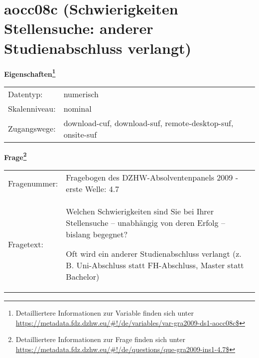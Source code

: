 
    \setcounter{footnote}{0}

    \vspace*{-1.8cm}
	\section{aocc08c (Schwierigkeiten Stellensuche: anderer Studienabschluss verlangt)}
	\label{section:aocc08c}



    \vspace*{0.5cm}
    \noindent\textbf{Eigenschaften\footnote{Detailliertere Informationen zur Variable finden sich unter
		\url{https://metadata.fdz.dzhw.eu/\#!/de/variables/var-gra2009-ds1-aocc08c$}}}\\
	\begin{tabularx}{\hsize}{@{}lX}
	Datentyp: & numerisch \\
	Skalenniveau: & nominal \\
	Zugangswege: &
	  download-cuf, 
	  download-suf, 
	  remote-desktop-suf, 
	  onsite-suf
 \\
    \end{tabularx}



				\vspace*{0.5cm}
                \noindent\textbf{Frage\footnote{Detailliertere Informationen zur Frage finden sich unter
		              \url{https://metadata.fdz.dzhw.eu/\#!/de/questions/que-gra2009-ins1-4.7$}}}\\
				\begin{tabularx}{\hsize}{@{}lX}
					Fragenummer: &
					  Fragebogen des DZHW-Absolventenpanels 2009 - erste Welle:
					  4.7
 \\
					Fragetext: & Welchen Schwierigkeiten sind Sie bei Ihrer Stellensuche – unabhängig von deren Erfolg – bislang begegnet?\par  Oft wird ein anderer Studienabschluss verlangt (z. B. Uni-Abschluss statt FH-Abschluss, Master statt Bachelor) \\
				\end{tabularx}





